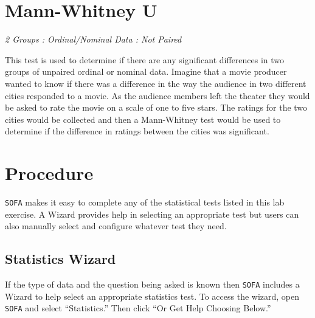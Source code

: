 \section{Mann-Whitney U} 

\textit{2 Groups : Ordinal/Nominal Data : Not Paired}

This test is used to determine if there are any significant differences in two groups of unpaired ordinal or nominal data. Imagine that a movie producer wanted to know if there was a difference in the way the audience in two different cities responded to a movie. As the audience members left the theater they would be asked to rate the movie on a scale of one to five stars. The ratings for the two cities would be collected and then a Mann-Whitney test would be used to determine if the difference in ratings between the cities was significant. 

\section{Procedure}

\texttt{SOFA} makes it easy to complete any of the statistical tests listed in this lab exercise. A Wizard provides help in selecting an appropriate test but users can also manually select and configure whatever test they need.

\subsection{Statistics Wizard}

If the type of data and the question being asked is known then \texttt{SOFA} includes a Wizard to help select an appropriate statistics test. To access the wizard, open \texttt{SOFA} and select ``Statistics.'' Then click ``Or Get Help Choosing Below.''

